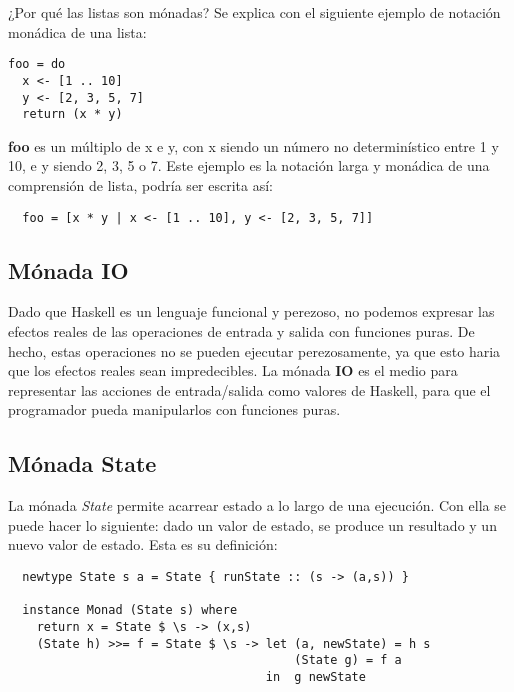 ¿Por qué las listas son mónadas? Se explica con el siguiente ejemplo de
notación monádica de una lista:

\begin{lstlisting}
foo = do
  x <- [1 .. 10]
  y <- [2, 3, 5, 7]
  return (x * y)
\end{lstlisting}

\textbf{foo} es un múltiplo de x e y, con x siendo un número no determinístico
entre 1 y 10, e y siendo 2, 3, 5 o 7. Este ejemplo es la notación larga y
monádica de una comprensión de lista, podría ser escrita así:

\begin{lstlisting}
  foo = [x * y | x <- [1 .. 10], y <- [2, 3, 5, 7]]
\end{lstlisting}


\subsection{Mónada IO} %

Dado que Haskell es un lenguaje funcional y perezoso, no podemos expresar las
efectos reales de las operaciones de entrada y salida con funciones puras. De
hecho, estas operaciones no se pueden ejecutar perezosamente, ya que esto
haria que los efectos reales sean impredecibles. La mónada \textbf{IO} es el
medio para representar las acciones de entrada/salida como valores de Haskell,
para que el programador pueda manipularlos con funciones puras.


\label{sub:m_nada_io}



\subsection{Mónada State} %
\label{sub:m_nada_state}

La mónada \textit{State} permite acarrear estado a lo largo de una ejecución.
Con ella se puede hacer lo siguiente: dado un valor de estado, se produce un
resultado y un nuevo valor de estado. Esta es su definición:

\begin{lstlisting}
  newtype State s a = State { runState :: (s -> (a,s)) }

  instance Monad (State s) where
    return x = State $ \s -> (x,s)
    (State h) >>= f = State $ \s -> let (a, newState) = h s
                                        (State g) = f a
                                    in  g newState
\end{lstlisting}

